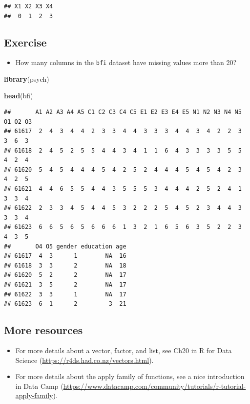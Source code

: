 \documentclass[]{book}
\newenvironment{Shaded}{\begin{snugshade}}{\end{snugshade}}
\newcommand{\KeywordTok}[1]{\textcolor[rgb]{0.13,0.29,0.53}{\textbf{#1}}}
\newcommand{\NormalTok}[1]{#1}
\providecommand{\tightlist}{%
  \setlength{\itemsep}{0pt}\setlength{\parskip}{0pt}}
\begin{document}
\begin{verbatim}
## X1 X2 X3 X4 
##  0  1  2  3
\end{verbatim}

\hypertarget{exercise-3}{%
\subsection{Exercise}\label{exercise-3}}

\begin{itemize}
\tightlist
\item
  How many columns in the \texttt{bfi} dataset have missing values more than 20?
\end{itemize}

\begin{Shaded}
\begin{Highlighting}[]
\KeywordTok{library}\NormalTok{(psych)}
\end{Highlighting}
\end{Shaded}

\begin{Shaded}
\begin{Highlighting}[]
\KeywordTok{head}\NormalTok{(bfi)}
\end{Highlighting}
\end{Shaded}

\begin{verbatim}
##       A1 A2 A3 A4 A5 C1 C2 C3 C4 C5 E1 E2 E3 E4 E5 N1 N2 N3 N4 N5 O1 O2 O3
## 61617  2  4  3  4  4  2  3  3  4  4  3  3  3  4  4  3  4  2  2  3  3  6  3
## 61618  2  4  5  2  5  5  4  4  3  4  1  1  6  4  3  3  3  3  5  5  4  2  4
## 61620  5  4  5  4  4  4  5  4  2  5  2  4  4  4  5  4  5  4  2  3  4  2  5
## 61621  4  4  6  5  5  4  4  3  5  5  5  3  4  4  4  2  5  2  4  1  3  3  4
## 61622  2  3  3  4  5  4  4  5  3  2  2  2  5  4  5  2  3  4  4  3  3  3  4
## 61623  6  6  5  6  5  6  6  6  1  3  2  1  6  5  6  3  5  2  2  3  4  3  5
##       O4 O5 gender education age
## 61617  4  3      1        NA  16
## 61618  3  3      2        NA  18
## 61620  5  2      2        NA  17
## 61621  3  5      2        NA  17
## 61622  3  3      1        NA  17
## 61623  6  1      2         3  21
\end{verbatim}

\hypertarget{more-resources-1}{%
\subsection{More resources}\label{more-resources-1}}

\begin{itemize}
\tightlist
\item
  For more details about a vector, factor, and list, see Ch20 in R for Data Science (\url{https://r4ds.had.co.nz/vectors.html}).
\item
  For more details about the apply family of functions, see a nice introduction in Data Camp (\url{https://www.datacamp.com/community/tutorials/r-tutorial-apply-family}).
\end{itemize}
\end{document}
